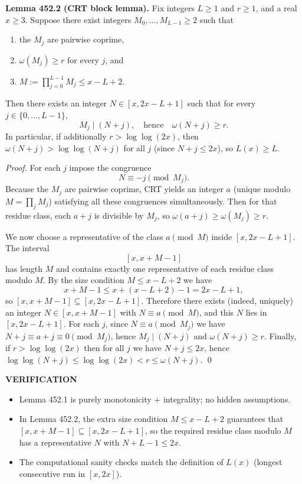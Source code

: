 \medskip

\textbf{Lemma 452.2 (CRT block lemma).}
Fix integers $L\ge 1$ and $r\ge 1$, and a real $x\ge 3$. Suppose there exist integers $M_0,\dots,M_{L-1}\ge 2$ such that
\begin{enumerate}
\item the $M_j$ are pairwise coprime,
\item $\omega(M_j)\ge r$ for every $j$, and
\item $M:=\prod_{j=0}^{L-1} M_j\le x-L+2$.
\end{enumerate}
Then there exists an integer $N\in[x,2x-L+1]$ such that for every $j\in\{0,\dots,L-1\}$,
\[
M_j\mid (N+j),\quad\text{hence}\quad \omega(N+j)\ge r.
\]
In particular, if additionally $r>\log\log(2x)$, then $\omega(N+j)>\log\log(N+j)$ for all $j$ (since $N+j\le 2x$), so $L(x)\ge L$.

\emph{Proof.}
For each $j$ impose the congruence
\[
N\equiv -j\pmod{M_j}.
\]
Because the $M_j$ are pairwise coprime, CRT yields an integer $a$ (unique modulo $M=\prod_j M_j$) satisfying all these congruences simultaneously.
Then for that residue class, each $a+j$ is divisible by $M_j$, so $\omega(a+j)\ge \omega(M_j)\ge r$.

We now choose a representative of the class $a\pmod M$ inside $[x,2x-L+1]$. The interval
\[
[x, x+M-1]
\]
has length $M$ and contains exactly one representative of each residue class modulo $M$. By the size condition $M\le x-L+2$ we have
\[
x+M-1\le x+(x-L+2)-1=2x-L+1,
\]
so $[x,x+M-1]\subseteq [x,2x-L+1]$. Therefore there exists (indeed, uniquely) an integer $N\in[x,x+M-1]$ with $N\equiv a\pmod M$, and this $N$ lies in $[x,2x-L+1]$.
For each $j$, since $N\equiv a\pmod{M_j}$ we have $N+j\equiv a+j\equiv 0\pmod{M_j}$, hence $M_j\mid(N+j)$ and $\omega(N+j)\ge r$.
Finally, if $r>\log\log(2x)$ then for all $j$ we have $N+j\le 2x$, hence $\log\log(N+j)\le \log\log(2x)< r\le \omega(N+j)$.
\qed

\medskip

\textbf{VERIFICATION}

\begin{itemize}
\item Lemma 452.1 is purely monotonicity + integrality; no hidden assumptions.
\item In Lemma 452.2, the extra size condition $M\le x-L+2$ guarantees that $[x,x+M-1]\subseteq[x,2x-L+1]$, so the required residue class modulo $M$ has a representative $N$ with $N+L-1\le 2x$.
\item The computational sanity checks match the definition of $L(x)$ (longest consecutive run in $[x,2x]$).
\end{itemize}

